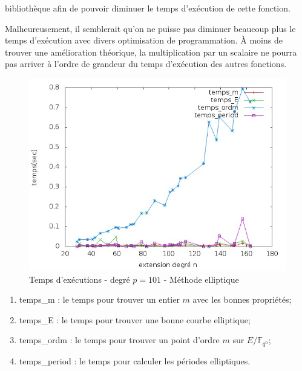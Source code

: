 \documentclass[a4paper]{article} %
\numberwithin{section}{part}
\numberwithin{equation}{section}
\newcommand\GF[1]{\mathbb{F}_{#1}}
\begin{document}
bibliothèque  afin de pouvoir diminuer le temps d'exécution de cette
fonction.\par
Malheureusement, il semblerait qu'on ne puisse pas diminuer beaucoup plus le
temps d'exécution avec divers optimisation de programmation. À moins de trouver
une amélioration théorique, la multiplication par un scalaire ne pourra pas
arriver à l'ordre de grandeur du temps d'exécution des autres fonctions.
\begin{figure}[H]
\begin{center}
\includegraphics[scale=0.6]{data_test1_p_fixed5}
\caption{Temps d'exécutions - degré $p = 101$ - Méthode elliptique}
\label{fig:tempsellpartpfixed}
\end{center}
\end{figure}
\begin{enumerate}[-]
	\item temps\_m : le temps pour trouver un entier $m$ avec les
bonnes propriétés;
	\item temps\_E : le temps pour trouver une bonne courbe elliptique;
	\item temps\_ordm : le temps pour trouver un point d'ordre $m$ sur
$E/\GF{q^n}$;
 	\item temps\_period : le temps pour calculer les périodes elliptiques.
\end{enumerate}
\end{document}
